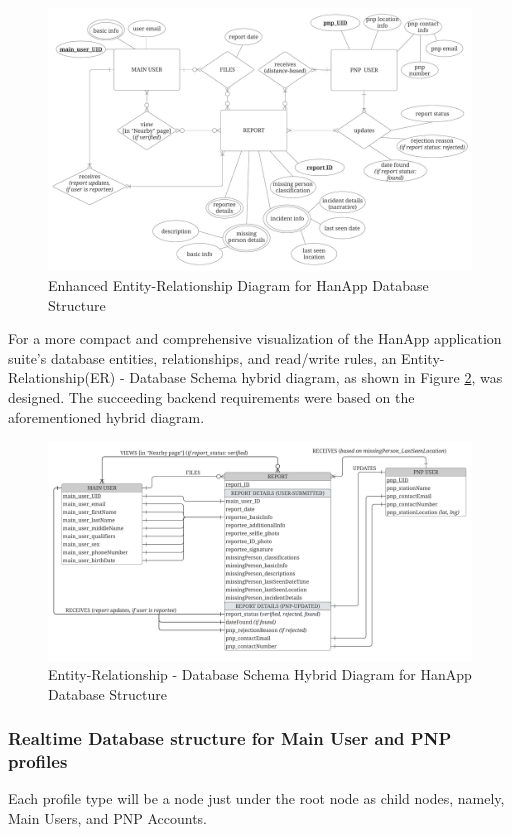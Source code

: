\begin{figure}[!h]
    \centering
    \includegraphics[width=\textwidth]{figures/Chapter3/eerd.jpeg}
    \caption{Enhanced Entity-Relationship Diagram for HanApp Database Structure}
    \label{fig:EERD}
\end{figure}

For a more compact and comprehensive visualization of the HanApp application suite’s database entities, relationships, and read/write rules, an Entity-Relationship(ER) - Database Schema hybrid diagram, as shown in Figure \ref{fig:hybridERDSchema}, was designed. The succeeding backend requirements were based on the aforementioned hybrid diagram.


\begin{figure}[ht!]
    \centering
    \includegraphics[width=\textwidth]{figures/Chapter3/erd_schema.jpeg}
    \caption{Entity-Relationship - Database Schema Hybrid Diagram for HanApp Database Structure}
    \label{fig:hybridERDSchema}
\end{figure}

\subsubsection{Realtime Database structure for Main User and PNP profiles}
Each profile type will be a node just under the root node as child nodes, namely, Main Users, and PNP Accounts. 

